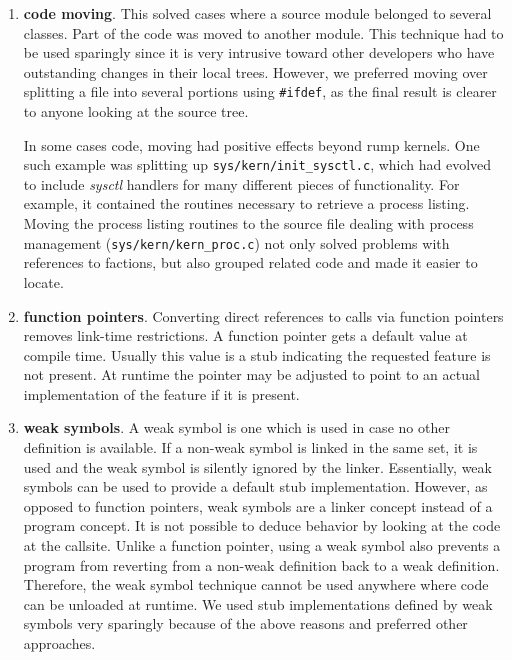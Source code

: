 \begin{enumerate}
\item   \textbf{code moving}.  This solved cases where a source
	module belonged to several classes.  Part of the code was
	moved to another module.  This technique had to be used
	sparingly since it is very intrusive toward other developers
	who have outstanding changes in their local trees.  However,
	we preferred moving over splitting a file into several
	portions using \texttt{\#ifdef}, as the final result is
	clearer to anyone looking at the source tree.

	In some cases code, moving had positive effects beyond rump
	kernels.  One such example was splitting up
	\verb+sys/kern/init_sysctl.c+, which had evolved to include
	\textit{sysctl} handlers for many different pieces of
	functionality.  For example, it contained the routines
	necessary to retrieve a process listing.  Moving the process
	listing routines to the source file dealing with process
	management (\verb+sys/kern/kern_proc.c+) not only solved
	problems with references to factions, but also
	grouped related code and made it easier to locate.

\item   \textbf{function pointers}.  Converting direct references
	to calls via function pointers removes link-time restrictions.
	A function pointer gets a default value at compile time.
	Usually this value is a stub indicating the requested feature is
	not present.  At runtime the pointer may be adjusted to
	point to an actual implementation of the feature if it is
	present.

\item   \textbf{weak symbols}.  A weak symbol is one which is used
	in case no other definition is available.  If a non-weak
	symbol is linked in the same set, it is used and the weak
	symbol is silently ignored by the linker.  Essentially,
	weak symbols can be used to provide a default stub
	implementation.  However, as opposed to function pointers,
	weak symbols are a linker concept instead of a program
	concept.  It is not possible to deduce behavior
	by looking at the code at the callsite.  Unlike a function
	pointer, using a weak symbol also prevents a program from
	reverting from a non-weak definition back to a weak
	definition.  Therefore, the weak symbol technique cannot
	be used anywhere where code can be unloaded at runtime.
	We used stub implementations defined by weak symbols very
	sparingly because of the above reasons and preferred other
	approaches.
\end{enumerate}

